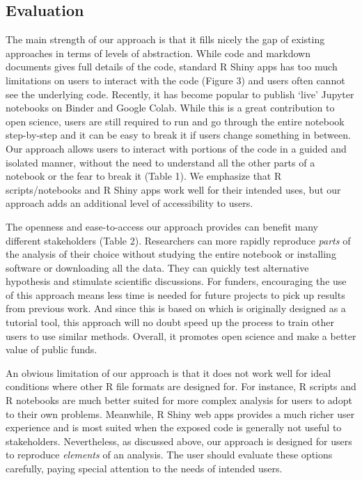 \hypertarget{evaluation}{%
\subsection{Evaluation}\label{evaluation}}

The main strength of our approach is that it fills nicely the gap of
existing approaches in terms of levels of abstraction. While code and
markdown documents gives full details of the code, standard R Shiny apps
has too much limitations on users to interact with the code (Figure 3)
and users often cannot see the underlying code. Recently, it has become
popular to publish `live' Jupyter notebooks on Binder and Google Colab.
While this is a great contribution to open science, users are still
required to run and go through the entire notebook step-by-step and
it can be easy to break it if users change something in between. Our
approach allows users to interact with portions of the code in a guided
and isolated manner, without the need to understand all the other parts
of a notebook or the fear to break it (Table 1). We emphasize that R
scripts/notebooks and R Shiny apps work well for their intended uses,
but our approach adds an additional level of accessibility to users.

The openness and ease-to-access our approach provides can benefit many
different stakeholders (Table 2). Researchers can more rapidly reproduce
\textit{parts} of the analysis of their choice without studying the entire
notebook or installing software or downloading all the data. They can
quickly test alternative hypothesis and stimulate scientific
discussions. For funders, encouraging the use of this approach means
less time is needed for future projects to pick up results from previous
work. And since this is based on  which is originally
designed as a tutorial tool, this approach will no doubt speed up the
process to train other users to use similar methods. Overall, it
promotes open science and make a better value of public funds.

An obvious limitation of our approach is that it does not work well for
ideal conditions where other R file formats are designed for. For
instance, R scripts and R notebooks are much better suited for more
complex analysis for users to adopt to their own problems. Meanwhile, R
Shiny web apps provides a much richer user experience and is most suited
when the exposed code is generally not useful to stakeholders.
Nevertheless, as discussed above, our approach is designed for users to
reproduce \textit{elements} of an analysis. The user should evaluate these
options carefully, paying special attention to the needs of intended
users.

